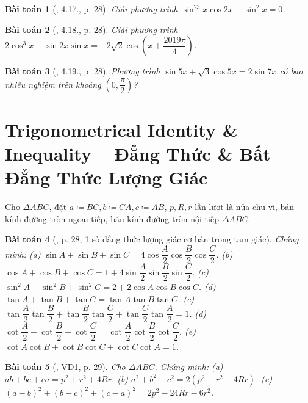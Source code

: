 \documentclass{article}
\newtheorem{baitoan}{Bài toán}
\begin{document}
\begin{baitoan}[\cite{Hung_nang_cao_phat_trien_Toan_11_tap_1}, 4.17., p. 28]
	Giải phương trình $\sin^23x\cos2x + \sin^2x = 0$.
\end{baitoan}

\begin{baitoan}[\cite{Hung_nang_cao_phat_trien_Toan_11_tap_1}, 4.18., p. 28]
	Giải phương trình $2\cos^3x - \sin2x\sin x = -2\sqrt{2}\cos\left(x + \dfrac{2019\pi}{4}\right)$.
\end{baitoan}

\begin{baitoan}[\cite{Hung_nang_cao_phat_trien_Toan_11_tap_1}, 4.19., p. 28]
	Phương trình $\sin5x + \sqrt{3}\cos5x = 2\sin7x$ có bao nhiêu nghiệm trên khoảng $\left(0,\dfrac{\pi}{2}\right)$?
\end{baitoan}


\section{Trigonometrical Identity \& Inequality -- Đẳng Thức \& Bất Đẳng Thức Lượng Giác}
Cho $\Delta ABC$, đặt $a\coloneqq BC, b\coloneqq CA, c\coloneqq AB$, $p,R,r$ lần lượt là nửa chu vi, bán kính đường tròn ngoại tiếp, bán kính đường tròn nội tiếp $\Delta ABC$.

\begin{baitoan}[\cite{Hung_nang_cao_phat_trien_Toan_11_tap_1}, p. 28, 1 số đẳng thức lượng giác cơ bản trong tam giác]
	Chứng minh: (a) $\sin A + \sin B + \sin C = 4\cos\dfrac{A}{2}\cos\dfrac{B}{2}\cos\dfrac{C}{2}$. (b) $\cos A + \cos B + \cos C = 1 + 4\sin\dfrac{A}{2}\sin\dfrac{B}{2}\sin\dfrac{C}{2}$. (c) $\sin^2A + \sin^2B + \sin^2C = 2 + 2\cos A\cos B\cos C$. (d) $\tan A + \tan B + \tan C = \tan A\tan B\tan C$. (c) $\tan\dfrac{A}{2}\tan\dfrac{B}{2} + \tan\dfrac{B}{2}\tan\dfrac{C}{2} + \tan\dfrac{C}{2}\tan\dfrac{A}{2} = 1$. (d) $\cot\dfrac{A}{2} + \cot\dfrac{B}{2} + \cot\dfrac{C}{2} = \cot\dfrac{A}{2}\cot\dfrac{B}{2}\cot\dfrac{C}{2}$. (e) $\cot A\cot B + \cot B\cot C + \cot C\cot A = 1$.
\end{baitoan}

\begin{baitoan}[\cite{Hung_nang_cao_phat_trien_Toan_11_tap_1}, VD1, p. 29]
	Cho $\Delta ABC$. Chứng minh: (a) $ab + bc + ca = p^2 + r^2 + 4Rr$. (b) $a^2 + b^2 + c^2 = 2(p^2 - r^2 - 4Rr)$. (c) $(a - b)^2 + (b - c)^2 + (c - a)^2 = 2p^2 - 24Rr - 6r^2$.
\end{baitoan}
\end{document}
